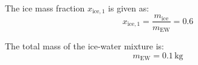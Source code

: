 The ice mass fraction \( x_{\text{ice},1} \) is given as:  
\[
x_{\text{ice},1} = \frac{m_{\text{ice}}}{m_{\text{EW}}} = 0.6
\]  

The total mass of the ice-water mixture is:  
\[
m_{\text{EW}} = 0.1 \, \text{kg}
\]